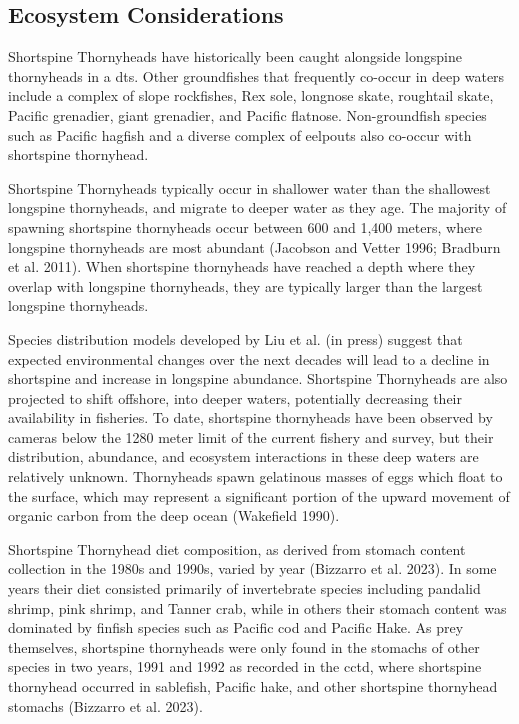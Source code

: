 \documentclass[11pt,
  english,
  letterpaper,
]{article}
\begin{document}
\hypertarget{ecosystem-considerations-1}{%
\subsection{Ecosystem Considerations}\label{ecosystem-considerations-1}}

Shortspine Thornyheads have historically been caught alongside longspine thornyheads in a \gls{dts}. Other groundfishes that frequently co-occur in deep waters include a complex of slope rockfishes, Rex sole, longnose skate, roughtail skate, Pacific grenadier, giant grenadier, and Pacific flatnose. Non-groundfish species such as Pacific hagfish and a diverse complex of eelpouts also co-occur with shortspine thornyhead.

Shortspine Thornyheads typically occur in shallower water than the shallowest longspine thornyheads, and migrate to deeper water as they age. The majority of spawning shortspine thornyheads occur between 600 and 1,400 meters, where longspine thornyheads are most abundant (Jacobson and Vetter 1996; Bradburn et al. 2011). When shortspine thornyheads have reached a depth where they overlap with longspine thornyheads, they are typically larger than the largest longspine thornyheads.

Species distribution models developed by Liu et al. (in press) suggest that expected environmental changes over the next decades will lead to a decline in shortspine and increase in longspine abundance. Shortspine Thornyheads are also projected to shift offshore, into deeper waters, potentially decreasing their availability in fisheries. To date, shortspine thornyheads have been observed by cameras below the 1280 meter limit of the current fishery and survey, but their distribution, abundance, and ecosystem interactions in these deep waters are relatively unknown. Thornyheads spawn gelatinous masses of eggs which float to the surface, which may represent a significant portion of the upward movement of organic carbon from the deep ocean (Wakefield 1990).

Shortspine Thornyhead diet composition, as derived from stomach content collection in the 1980s and 1990s, varied by year (Bizzarro et al. 2023). In some years their diet consisted primarily of invertebrate species including pandalid shrimp, pink shrimp, and Tanner crab, while in others their stomach content was dominated by finfish species such as Pacific cod and Pacific Hake. As prey themselves, shortspine thornyheads were only found in the stomachs of other species in two years, 1991 and 1992 as recorded in the \gls{cctd}, where shortspine thornyhead occurred in sablefish, Pacific hake, and other shortspine thornyhead stomachs (Bizzarro et al. 2023).
\end{document}
